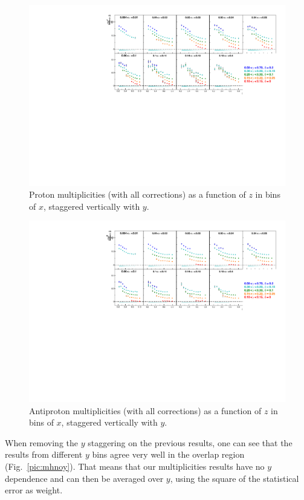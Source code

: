 \begin{figure}[!h]
  \centering
	\includegraphics[scale=0.85]{./gfx/pp.pdf}
	\caption{Proton multiplicities (with all corrections) as a function of $z$ in bins of $x$, staggered vertically with $y$.}
	\label{pic:mpp}
\end{figure}

\newpage

\begin{figure}[!h]
  \centering
	\includegraphics[scale=0.85]{./gfx/pm.pdf}
	\caption{Antiproton multiplicities (with all corrections) as a function of $z$ in bins of $x$, staggered vertically with $y$.}
	\label{pic:mpm}
\end{figure}

When removing the $y$ staggering on the previous results, one can see that the results from different $y$ bins agree very well in the overlap region (Fig.~\ref{pic:mhnoy}). That means that our multiplicities results have no $y$ dependence and can then be averaged over $y$, using the square of the statistical error as weight.

